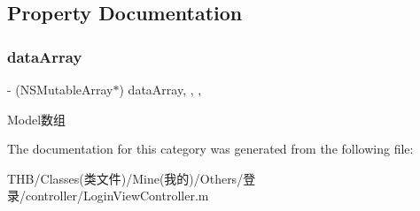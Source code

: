 \subsection{Property Documentation}
\mbox{\label{category_login_view_controller_07_08_a2e8f95aea7187f23303f8fd65759186d}} 
\subsubsection{\texorpdfstring{data\+Array}{dataArray}}
{\footnotesize\ttfamily -\/ (N\+S\+Mutable\+Array$\ast$) data\+Array\hspace{0.3cm}{\ttfamily [read]}, {\ttfamily [write]}, {\ttfamily [nonatomic]}, {\ttfamily [strong]}}

Model数组 

The documentation for this category was generated from the following file\+:\begin{DoxyCompactItemize}
\item 
T\+H\+B/\+Classes(类文件)/\+Mine(我的)/\+Others/登录/controller/Login\+View\+Controller.\+m\end{DoxyCompactItemize}
